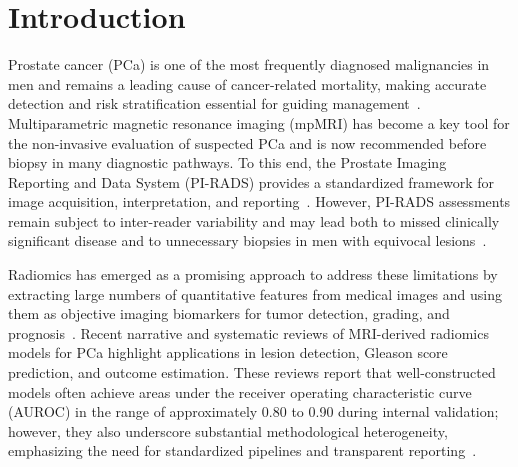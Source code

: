 \documentclass[11pt]{article}
\begin{document}


\section{Introduction}
\label{sec:intro}

Prostate cancer (PCa) is one of the most frequently diagnosed malignancies in men and remains a leading cause of cancer-related mortality, making accurate detection and risk stratification essential for guiding management~\citep{Midiri2021Diagnostics,li2022machine}. Multiparametric magnetic resonance imaging (mpMRI) has become a key tool for the non-invasive evaluation of suspected PCa and is now recommended before biopsy in many diagnostic pathways. To this end, the Prostate Imaging Reporting and Data System (PI-RADS) provides a standardized framework for image acquisition, interpretation, and reporting~\citep{Midiri2021Diagnostics,li2022machine}. However, PI-RADS assessments remain subject to inter-reader variability and may lead both to missed clinically significant disease and to unnecessary biopsies in men with equivocal lesions~\citep{Midiri2021Diagnostics}.

Radiomics has emerged as a promising approach to address these limitations by extracting large numbers of quantitative features from medical images and using them as objective imaging biomarkers for tumor detection, grading, and prognosis~\citep{Midiri2021Diagnostics,Bao2024}. Recent narrative and systematic reviews of MRI-derived radiomics models for PCa highlight applications in lesion detection, Gleason score prediction, and outcome estimation. These reviews report that well-constructed models often achieve areas under the receiver operating characteristic curve (AUROC) in the range of approximately 0.80 to 0.90 during internal validation; however, they also underscore substantial methodological heterogeneity, emphasizing the need for standardized pipelines and transparent reporting~\citep{Midiri2021Diagnostics,JZUSciB2023MRIRadiomics,collins2024tripodai}.
\end{document}
